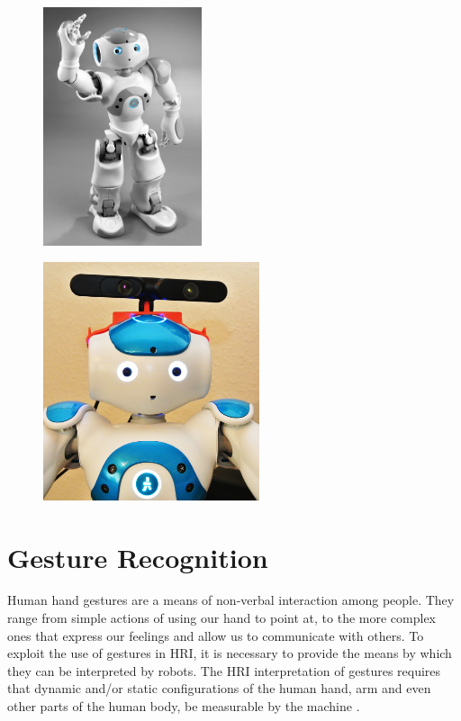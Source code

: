 \begin{figure}
	\centering
	\begin{minipage}{.5\textwidth}
		\centering
\includegraphics[height=7cm]{figures/nao.png} 
		\label{fig:nao}
	\end{minipage}%
	\begin{minipage}{.5\textwidth}
		\centering
\includegraphics[height=7cm]{figures/nao-xtion.png} 
		\label{fig:xtion}
	\end{minipage}
\end{figure}

\section{Gesture Recognition} 
Human hand gestures are a means of non-verbal interaction among people. They range from simple actions of using our hand to point at, to the more complex ones that express our feelings and allow us to communicate with others. To exploit the use of gestures in HRI, it is necessary to provide the means by which they can be interpreted by robots. The HRI interpretation of gestures requires that dynamic and/or static configurations of the human hand, arm and even other parts of the human body, be measurable by the machine \cite{6}. 

